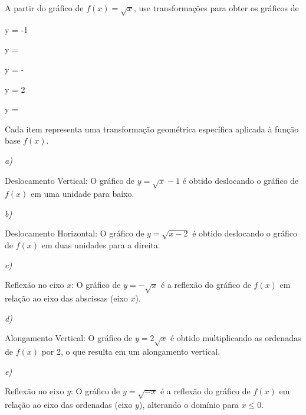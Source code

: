 \begin{example}
  A partir do gráfico de $f(x)= \sqrt{x}$,
  use transformações para obter os gráficos de
  \begin{mathlist}
    \item y =  -1
    \item y =  
    \item y = -
    \item y = 2
    \item y =  
  \end{mathlist}

  \solution
  Cada item representa uma transformação geométrica específica aplicada à
  função base $f(x)$.

  \emph{a)}

  Deslocamento Vertical: O gráfico de $y = \sqrt{x} - 1$ é obtido deslocando
  o gráfico de $f(x)$ em uma unidade para baixo.

  \emph{b)}

  Deslocamento Horizontal: O gráfico de $y = \sqrt{x-2}$ é obtido deslocando
  o gráfico de $f(x)$ em duas unidades para a direita.

  \emph{c)}

  Reflexão no eixo $x$: O gráfico de $y = -\sqrt{x}$ é a reflexão do
  gráfico de $f(x)$ em relação ao eixo das abscissas (eixo $x$).

  \emph{d)}

  Alongamento Vertical: O gráfico de $y = 2\sqrt{x}$ é obtido multiplicando
  as ordenadas de $f(x)$ por 2, o que resulta em um alongamento vertical.

  \emph{e)}

  Reflexão no eixo $y$: O gráfico de $y = \sqrt{-x}$ é a reflexão do
  gráfico de $f(x)$ em relação ao eixo das ordenadas (eixo $y$), alterando o
  domínio para $x \leq 0$.

\end{example}
